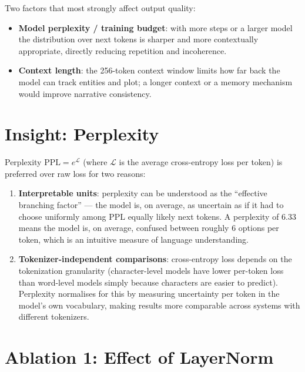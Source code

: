 \documentclass{article}
\begin{document}
Two factors that most strongly affect output quality:
\begin{itemize}
  \item \textbf{Model perplexity / training budget}: with more steps or a
        larger model the distribution over next tokens is sharper and more
        contextually appropriate, directly reducing repetition and incoherence.
  \item \textbf{Context length}: the 256-token context window limits how far
        back the model can track entities and plot; a longer context or a
        memory mechanism would improve narrative consistency.
\end{itemize}

\section{Insight: Perplexity}

Perplexity $\text{PPL} = e^{\mathcal{L}}$ (where $\mathcal{L}$ is the
average cross-entropy loss per token) is preferred over raw loss for two
reasons:

\begin{enumerate}
  \item \textbf{Interpretable units}: perplexity can be understood as the
        ``effective branching factor'' --- the model is, on average, as
        uncertain as if it had to choose uniformly among $\text{PPL}$ equally
        likely next tokens.  A perplexity of 6.33 means the model is, on
        average, confused between roughly 6 options per token, which is an
        intuitive measure of language understanding.

  \item \textbf{Tokenizer-independent comparisons}: cross-entropy loss
        depends on the tokenization granularity (character-level models have
        lower per-token loss than word-level models simply because characters
        are easier to predict).  Perplexity normalises for this by measuring
        uncertainty per token in the model's own vocabulary, making results
        more comparable across systems with different tokenizers.
\end{enumerate}

\section{Ablation 1: Effect of LayerNorm}
\end{document}
